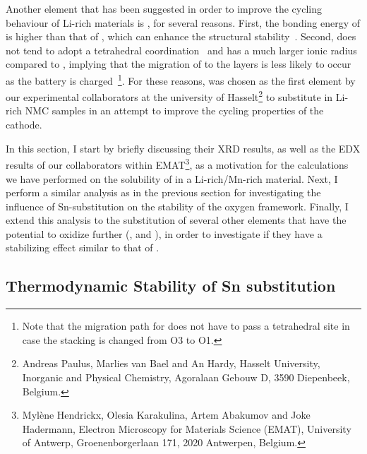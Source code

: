 \begin{refsection}
Another element that has been suggested in order to improve the cycling 
behaviour of Li-rich materials is , for several reasons. First, 
the bonding energy of  is higher than that of , which can 
enhance the structural stability~\cite{Qiao2015}. Second,  does 
not tend to adopt a tetrahedral coordination~\cite{Sathiya2013} and has a much 
larger ionic radius compared to , implying that the migration of 
 to the  layers is less likely to occur as the battery is 
charged~\footnote{Note that the migration path for  does not have 
to pass a tetrahedral site in case the stacking is changed from O3 to O1.}. 
For these reasons,  was chosen as the first element by our 
experimental collaborators at the university of Hasselt\footnote{Andreas Paulus, 
Marlies van Bael and An Hardy, Hasselt University, Inorganic and Physical 
Chemistry, Agoralaan Gebouw D, 3590 Diepenbeek, Belgium.} to substitute in 
Li-rich NMC samples in an attempt to improve the cycling properties of the 
cathode. 

In this section, I start by briefly discussing their XRD results, as well as 
the EDX results of our collaborators within EMAT\footnote{Myl\`ene Hendrickx, Olesia 
Karakulina, Artem Abakumov and Joke Hadermann, Electron Microscopy for Materials 
Science (EMAT), University of Antwerp, Groenenborgerlaan 171, 2020 Antwerpen, 
Belgium.}, as a motivation for the 
calculations we have performed on the solubility of  in a 
Li-rich/Mn-rich material. Next, I perform a similar analysis as in the 
previous section for investigating the influence of Sn-substitution on the 
stability of the oxygen framework. Finally, I extend this analysis to the 
substitution of several other elements that have the potential to oxidize 
further (,  and ), in order to investigate if they have a 
stabilizing effect similar to that of .  

\subsection{Thermodynamic Stability of Sn substitution} 
\label{batteries:sec-Sn_stability} 
 

\end{refsection}
